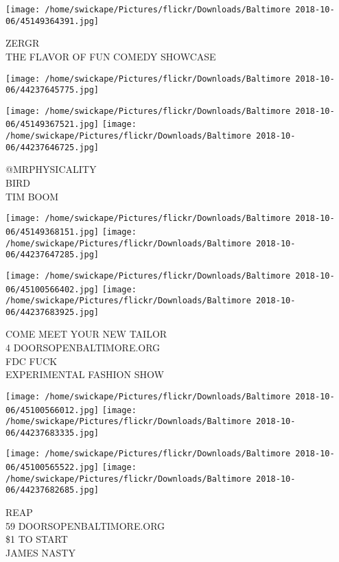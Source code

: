 \documentclass[10pt,letterpaper]{article}
\begin{document}
\vspace{0.25in}
\texttt{[image: /home/swickape/Pictures/flickr/Downloads/Baltimore 2018-10-06/45149364391.jpg]}

ZERGR\\
THE FLAVOR OF FUN COMEDY SHOWCASE\\
\pagebreak

\texttt{[image: /home/swickape/Pictures/flickr/Downloads/Baltimore 2018-10-06/44237645775.jpg]}

\vspace{0.25in}
\texttt{[image: /home/swickape/Pictures/flickr/Downloads/Baltimore 2018-10-06/45149367521.jpg]}
\texttt{[image: /home/swickape/Pictures/flickr/Downloads/Baltimore 2018-10-06/44237646725.jpg]}

@MRPHYSICALITY\\
BIRD\\
TIM BOOM\\
\pagebreak

\texttt{[image: /home/swickape/Pictures/flickr/Downloads/Baltimore 2018-10-06/45149368151.jpg]}
\texttt{[image: /home/swickape/Pictures/flickr/Downloads/Baltimore 2018-10-06/44237647285.jpg]}

\texttt{[image: /home/swickape/Pictures/flickr/Downloads/Baltimore 2018-10-06/45100566402.jpg]}
\texttt{[image: /home/swickape/Pictures/flickr/Downloads/Baltimore 2018-10-06/44237683925.jpg]}

COME MEET YOUR NEW TAILOR\\
4 DOORSOPENBALTIMORE.ORG\\
FDC FUCK\\
EXPERIMENTAL FASHION SHOW\\
\pagebreak

\texttt{[image: /home/swickape/Pictures/flickr/Downloads/Baltimore 2018-10-06/45100566012.jpg]}
\texttt{[image: /home/swickape/Pictures/flickr/Downloads/Baltimore 2018-10-06/44237683335.jpg]}

\texttt{[image: /home/swickape/Pictures/flickr/Downloads/Baltimore 2018-10-06/45100565522.jpg]}
\texttt{[image: /home/swickape/Pictures/flickr/Downloads/Baltimore 2018-10-06/44237682685.jpg]}

REAP\\
59 DOORSOPENBALTIMORE.ORG\\
\$1 TO START\\
JAMES NASTY\\
\pagebreak
\end{document}
